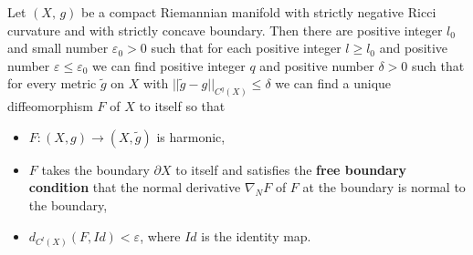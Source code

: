 \begin{lemma} 
  \label{lem:cz-concave-boundary-metric-perturbations}

Let\; $(X,\,g)$\; be\; a\; compact\; Riemannian\; manifold\; with
strictly negative Ricci curvature and with strictly concave
boundary. Then there are positive integer $l_0$ and small number
$\varepsilon_0>0$ such that for each positive integer $l\ge l_0$ and
positive number $\varepsilon\le\varepsilon_0$ we can find positive
integer $q$ and positive number $\delta>0$ such that for every
metric $\tilde{g}$ on $X$ with $||\tilde{g}-g||_{C^q(X)}\le \delta$
we can find a unique diffeomorphism $F$ of $X$ to itself so that
\begin{itemize}
\item[(a)] $F: (X,g)\rightarrow (X,\tilde{g})$ is harmonic,
\item[(b)] $F$ takes the boundary $\partial X$ to itself and
satisfies the {\bf free boundary condition} that the normal derivative $\nabla_NF$ of $F$ at the
boundary is normal to the boundary, \item[(c)]
$d_{C^l(X)}(F,Id)<\varepsilon$, where $Id$ is the identity map.
\end{itemize}
\end{lemma}

